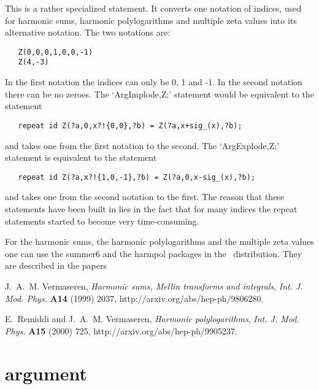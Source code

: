\noindent This is a rather specialized statement. It converts one notation 
of indices, used for harmonic sums, harmonic 
polylogarithms and multiple zeta values into 
its alternative notation. The two notations are:
\begin{verbatim}
   Z(0,0,0,1,0,0,-1)
   Z(4,-3)
\end{verbatim}
In the first notation the indices can only be 0, 1 and -1. In the second 
notation there can be no zeroes. The `ArgImplode,Z;' 
statement would be 
equivalent to the statement
\begin{verbatim}
   repeat id Z(?a,0,x?!{0,0},?b) = Z(?a,x+sig_(x),?b);
\end{verbatim}
and takes one from the first notation to the second. The `ArgExplode,Z;' 
statement is equivalent to the statement
\begin{verbatim}
   repeat id Z(?a,x?!{1,0,-1},?b) = Z(?a,0,x-sig_(x),?b);
\end{verbatim}
and takes one from the second notation to the first. The reason that these 
statements have been built in lies in the fact that for many indices the 
repeat statements started to become very time-consuming.

\noindent For the harmonic sums, the harmonic polylogarithms and the 
multiple zeta values one can use the summer6 and the harmpol packages in 
the \FORM\ distribution. They are described in the papers

J.~A.~M. Vermaseren, {\it Harmonic sums, Mellin transforms and integrals},
  {\em Int. J. Mod. Phys.} {\bf A14} (1999) 2037,
  http://arxiv.org/abs/hep-ph/9806280.

E.~Remiddi and J.~A.~M. Vermaseren, {\it Harmonic polylogarithms},  {\em 
Int. J. Mod. Phys.} {\bf A15} (2000) 725,
  http://arxiv.org/abs/hep-ph/9905237.
\vspace{10mm}


\section{argument}
\label{substaargument}

